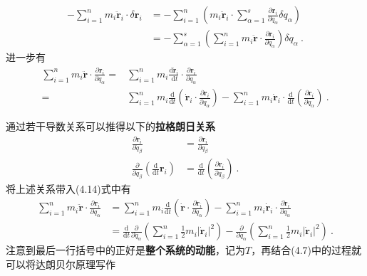 \documentclass[a4paper,c5size,twoside,UTF8]{ctexart} %
\numberwithin{equation}{section}   %
\begin{document}
\begin{equation}
    \begin{aligned}
        -\sum_{i=1}^{n} m_{i} \ddot{\boldsymbol{r}}_{i} \cdot \delta \boldsymbol{r}_{i} & =-\sum_{i=1}^{n}\left(m_{i} \ddot{\boldsymbol{r}}_{i} \cdot \sum_{\alpha=1}^{s} \frac{\partial \boldsymbol{r}_{i}}{\partial q_{\alpha}} \delta q_{\alpha}\right) \\
        & =-\sum_{\alpha=1}^{s}\left(\sum_{i=1}^{n} m_{i} \ddot{\boldsymbol{r}} \cdot \frac{\partial \boldsymbol{r}_{i}}{\partial q_{\alpha}}\right) \delta q_{\alpha} ~.
     \end{aligned}
\end{equation}
进一步有
\begin{equation}
\begin{aligned}
    \sum_{i=1}^{n} m_{i} \ddot{\boldsymbol{r}} \cdot \frac{\partial \boldsymbol{r}_{i}}{\partial q_{\alpha}}= & \sum_{i=1}^{n} m_{i} \frac{\mathrm{d} \dot{\boldsymbol{r}}_{i}}{\mathrm{~d} t} \cdot \frac{\partial \boldsymbol{r}_{i}}{\partial q_{\alpha}} \\
    = & \sum_{i=1}^{n} m_{i} \frac{\mathrm{d}}{\mathrm{d} t}\left(\dot{\boldsymbol{r}}_{i} \cdot \frac{\partial \boldsymbol{r}_{i}}{\partial q_{\alpha}}\right)-\sum_{i=1}^{n} m_{i} \dot{\boldsymbol{r}}_{i} \cdot \frac{\mathrm{d}}{\mathrm{d} t}\left(\frac{\partial \boldsymbol{r}_{i}}{\partial q_{\alpha}}\right) ~.
    \end{aligned}
\end{equation}

通过若干导数关系可以推得以下的\textbf{拉格朗日关系}
    \begin{align}
        \frac{\partial \dot{\boldsymbol{r}}_{i}}{\partial \dot{q}_{\beta}}&=\frac{\partial \boldsymbol{r}_{i}}{\partial q_{\beta}} \\
        \frac{\partial}{\partial q_{\beta}}\left(\frac{\mathrm{d}}{\mathrm{d} t} \boldsymbol{r}_{i}\right)&=\frac{\mathrm{d}}{\mathrm{d} t}\left(\frac{\partial \boldsymbol{r}_{i}}{\partial q_{\beta}}\right) ~.
    \end{align}
将上述关系带入(4.14)式中有
\begin{equation}
    \begin{aligned}
        \sum_{i=1}^{n} m_{i} \ddot{\boldsymbol{r}} \cdot \frac{\partial \boldsymbol{r}_{i}}{\partial q_{\alpha}} & =\sum_{i=1}^{n} m_{i} \frac{\mathrm{d}}{\mathrm{d} t}\left(\dot{\boldsymbol{r}} \cdot \frac{\partial \dot{\boldsymbol{r}}_{i}}{\partial \dot{q}_{\alpha}}\right)-\sum_{i=1}^{n} m_{i} \dot{\boldsymbol{r}}_{i} \cdot \frac{\partial \dot{\boldsymbol{r}}_{i}}{\partial q_{\alpha}} \\
        & =\frac{\mathrm{d}}{\mathrm{d} t} \frac{\partial}{\partial \dot{q}_{\alpha}}\left(\sum_{i=1}^{n} \frac{1}{2} m_{i}\left|\dot{\boldsymbol{r}}_{i}\right|^{2}\right)-\frac{\partial}{\partial q_{\alpha}}\left(\sum_{i=1}^{n} \frac{1}{2} m_{i}\left|\dot{\boldsymbol{r}}_{i}\right|^{2}\right)~.
    \end{aligned}
\end{equation}
注意到最后一行括号中的正好是\textbf{整个系统的动能}，记为$T$，再结合(4.7)中的过程就可以将达朗贝尔原理写作
\end{document}
